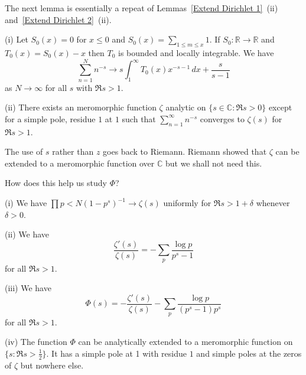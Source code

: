The next lemma is essentially a repeat of 
Lemmas~\ref{Extend Dirichlet 1}~(ii)
and~\ref{Extend Dirichlet 2}~(ii).
\begin{lemma} 
(i) Let $S_{0}(x)=0$ for $x\leq 0$ and
$S_{0}(x)=\sum_{1\leq m\leq x}1$. If
$S_{0}:{\mathbb R}\rightarrow{\mathbb R}$
and $T_{0}(x)=S_{0}(x)-x$ then $T_{0}$ is bounded
and locally integrable. We have
\[\sum_{n=1}^{N}n^{-s}\rightarrow 
s\int_{1}^{\infty}T_{0}(x)x^{-s-1}\, dx+\frac{s}{s-1}\]
as $N\rightarrow\infty$ for all $s$ with $\Re s>1$.

(ii) There exists an meromorphic function $\zeta$
analytic on $\{s\in{\mathbb C}:\Re s>0\}$ except for
a simple pole, residue $1$ at $1$ such that
$\sum_{n=1}^{\infty}n^{-s}$ converges to 
$\zeta(s)$ for $\Re s>1$.
\end{lemma}
The use of $s$ rather than $z$ goes back to Riemann.
Riemann showed that $\zeta$ can be extended to a meromorphic
function over ${\mathbb C}$ but we shall not need this.

How does this help us study $\Phi$?
\begin{lemma}\label{extend half}
(i) We have $\prod{p<N}(1-p^{s})^{-1}\rightarrow \zeta(s)$
uniformly for $\Re s>1+\delta$ whenever $\delta>0$.

(ii) We have
\[\frac{\zeta'(s)}{\zeta(s)}=-\sum_{p}\frac{\log p}{p^{s}-1}\]
for all $\Re s>1$.

(iii) We have
\[\Phi(s)=-\frac{\zeta'(s)}{\zeta(s)}-
\sum_{p}\frac{\log p}{(p^{s}-1)p^{s}}\]
for all $\Re s>1$.

(iv) The function $\Phi$ can be analytically extended
to a meromorphic function on
$\{s:\Re s>\frac{1}{2}\}$. It has a simple pole at 1
with residue $1$ and simple poles at the zeros of
$\zeta$ but nowhere else.
\end{lemma}


